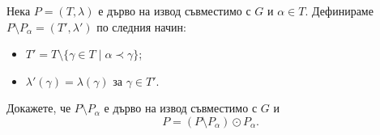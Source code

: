 \begin{problem}
  Нека $P = (T,\lambda)$ е дърво на извод съвместимо с $G$ и $\alpha \in T$.
  Дефинираме $P \setminus P_\alpha = (T',\lambda')$ по следния начин:
  \begin{itemize}
  \item
    $T' = T \setminus \{ \gamma \in T\mid \alpha \prec \gamma\}$;
  \item
    $\lambda'(\gamma) = \lambda(\gamma)$ за $\gamma \in T'$.
  \end{itemize}
  Докажете, че $P\setminus P_\alpha$ е дърво на извод съвместимо с $G$ и 
  \[P = (P\setminus P_\alpha) \odot P_\alpha.\]
\end{problem}



